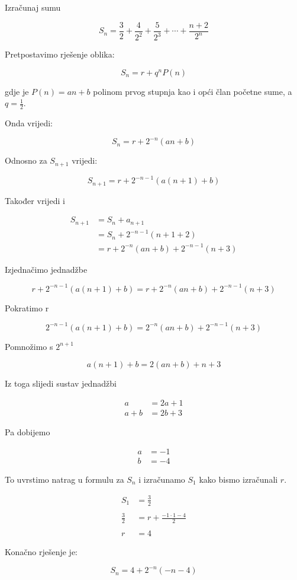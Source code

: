 \documentclass[exam.tex]{subfiles}
\begin{document}
	\begin{task}
		Izračunaj sumu
	
		\[ S_n = \frac{3}{2} + \frac{4}{2^2} + \frac{5}{2^3} + \cdots + \frac{n+2}{2^n} \]
	\end{task}
	
	Pretpostavimo rješenje oblika:
	
	\[ S_n = r + q^n P(n) \]
	
	gdje je \( P(n) = an + b \) polinom prvog stupnja kao i opći član početne sume, a \( q = \frac{1}{2} \).
	
	Onda vrijedi:
	
	\[ S_n = r + 2^{-n} (an + b) \]
	
	Odnosno za \( S_{n+1} \) vrijedi:
	
	\[ S_{n + 1} = r + 2^{-n-1} (a(n + 1) + b) \]
	
	Također vrijedi i
	
	\begin{align*}
		S_{n + 1} &= S_n + a_{n + 1} \\
		&= S_n + 2^{-n - 1} (n + 1 + 2)  \\
		&= r + 2^{-n} (an + b) + 2^{-n-1} (n + 3) 
	\end{align*}
	
	Izjednačimo jednadžbe
	
	\[ r + 2^{-n-1} (a(n + 1) + b) = r + 2^{-n} (an + b) + 2^{-n-1} (n + 3) \]
	
	Pokratimo r
	
	\[ 2^{-n-1} (a(n + 1) + b) = 2^{-n} (an + b) + 2^{-n-1} (n + 3) \]
	
	Pomnožimo s \( 2^{n+1} \)
	
	\[ a(n + 1) + b = 2 (an + b) +  n + 3 \]
	
	Iz toga slijedi sustav jednadžbi
	
	\begin{align*}
		a &= 2a + 1 \\
		a + b &= 2b + 3
	\end{align*}
	
	Pa dobijemo 
	
	\begin{align*}
		a &= -1 \\
		b &= -4
	\end{align*}
	
	To uvrstimo natrag u formulu za \( S_n \) i izračunamo \( S_1 \) kako bismo izračunali \( r \).
	
	\begin{align*}
		S_1 &= \frac{3}{2} \\ 
		\\
		\frac{3}{2} &= r + \frac{-1 \cdot 1 - 4}{2} \\
		\\	
		r &= 4
	\end{align*}
	
	Konačno rješenje je:
	
	\[ S_n = 4 + 2^{-n} (-n -4) \]
\end{document}
